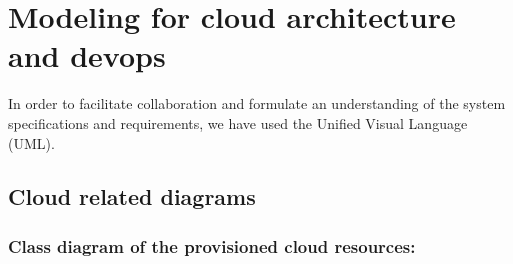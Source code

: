 \newpage
\section{Modeling for cloud architecture and devops }

In order to facilitate collaboration and formulate an understanding of the system specifications and requirements, we have used the Unified Visual Language (UML). 

\subsection{Cloud related diagrams }





\subsubsection{Class diagram of the provisioned cloud resources:}

